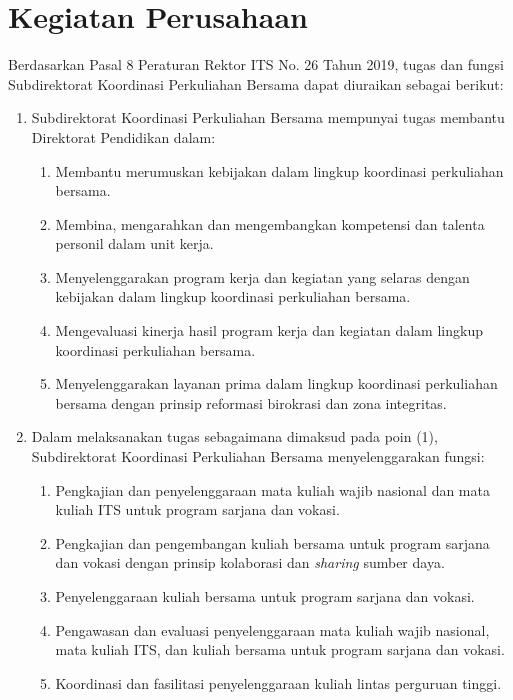 \documentclass{file/KP-ITS}
\theoremstyle{definition}
\theoremstyle{definition}
\theoremstyle{plain}
\begin{document}
\section{Kegiatan Perusahaan}
Berdasarkan Pasal 8 Peraturan Rektor ITS No. 26 Tahun 2019, tugas dan fungsi Subdirektorat Koordinasi Perkuliahan Bersama dapat diuraikan sebagai berikut:
\begin{enumerate}
  \item Subdirektorat Koordinasi Perkuliahan Bersama mempunyai tugas membantu Direktorat Pendidikan dalam:
        \begin{enumerate}
          \item Membantu merumuskan kebijakan dalam lingkup koordinasi perkuliahan bersama.
          \item Membina, mengarahkan dan mengembangkan kompetensi dan talenta personil dalam unit kerja.
          \item Menyelenggarakan program kerja dan kegiatan yang selaras dengan kebijakan dalam lingkup koordinasi perkuliahan bersama.
          \item Mengevaluasi kinerja hasil program kerja dan kegiatan dalam lingkup koordinasi perkuliahan bersama.
          \item Menyelenggarakan layanan prima dalam lingkup koordinasi perkuliahan bersama dengan prinsip reformasi birokrasi dan zona integritas.
        \end{enumerate}

  \item Dalam melaksanakan tugas sebagaimana dimaksud pada poin (1), Subdirektorat Koordinasi Perkuliahan Bersama menyelenggarakan fungsi:
        \begin{enumerate}
          \item Pengkajian dan penyelenggaraan mata kuliah wajib nasional dan mata kuliah ITS untuk program sarjana dan vokasi.
          \item Pengkajian dan pengembangan kuliah bersama untuk program sarjana dan vokasi dengan prinsip kolaborasi dan \textit{sharing} sumber daya.
          \item Penyelenggaraan kuliah bersama untuk program sarjana dan vokasi.
          \item Pengawasan dan evaluasi penyelenggaraan mata kuliah wajib nasional, mata kuliah ITS, dan kuliah bersama untuk program sarjana dan vokasi.
          \item Koordinasi dan fasilitasi penyelenggaraan kuliah lintas perguruan tinggi.
        \end{enumerate}
\end{enumerate}
\end{document}
